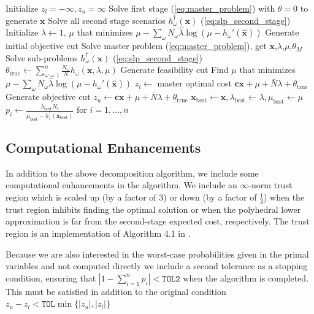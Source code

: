 \documentclass[11pt]{article}
\newcommand{\x}{\mathbf{x}}
\newcommand{\xh}{\hat{\x}}
\newcommand{\lh}{\hat{\lambda}}
\renewcommand{\c}{\mathbf{c}}
\begin{document}
\begin{algorithmic}
	\State Initialize $z_l = -\infty, z_u = \infty$
	\State Solve first stage (\ref{eq:master_problem}) with $\theta = 0$  to generate $\x$
	\State Solve all second stage scenarios $h^\dagger_\omega(\x)$ (\ref{eq:slp_second_stage})
	\State Initialize $\lambda \gets 1$, $\mu$ that minimizes $\mu - \sum_\omega N_\omega \lh \log(\mu - h_\omega'(\xh))$
	\State Generate initial objective cut
		\State Solve master problem (\ref{eq:master_problem}), get $\x$,$\lambda$,$\mu$,$\theta_M$
		\State Solve sub-problems $h^\dagger_\omega(\x)$ (\ref{eq:slp_second_stage})
		\State $\theta_{\text{true}} \gets \sum_{\omega=1}^n \frac{N_\omega}{N} h_\omega(\x,\lambda,\mu)$
		\If{$\mu < \max_i h_i'(\x)$}
			\State Generate feasibility cut
			\State Find $\mu$ that minimizes $\mu - \sum_\omega N_\omega \lh \log(\mu - h_\omega'(\xh))$
		\Else
			\State $z_l \gets$ master optimal cost $\c\x + \mu + \bar{N}\lambda + \theta_{\text{true}}$
		\EndIf
		\State Generate objective cut
		\If{$\c\x + \mu + \bar{N}\lambda + \theta_{\text{true}} < z_u$}
			\State $z_u \gets \c\x + \mu + \bar{N}\lambda + \theta_{\text{true}}$
			\State $\x_\text{best} \gets \x, \lambda_\text{best} \gets \lambda, \mu_\text{best} \gets \mu$
			\State $p_i \gets \frac{\lambda_\text{best} N_i}{\mu_\text{best} - h^\dagger_i(\x_\text{best})}$ for $i = 1, \dots, n$
		\EndIf
	\EndWhile
\end{algorithmic}

\subsection{Computational Enhancements}

In addition to the above decomposition algorithm, we include some computational enhancements in the algorithm.  We include an $\infty$-norm trust region which is scaled up (by a factor of $3$) or down (by a factor of $\tfrac{1}{4}$) when the trust region inhibits finding the optimal solution or when the polyhedral lower approximation is far from the second-stage expected cost, respectively.  The trust region is an implementation of Algorithm 4.1 in \cite{nocedal1999numerical}.

Because we are also interested in the worst-case probabilities given in the primal variables and not computed directly we include a second tolerance as a stopping condition, ensuring that $\left| 1 - \sum_{i=1}^n p_i \right| < \texttt{TOL2}$ when the algorithm is completed.  This must be satisfied in addition to the original condition $z_u - z_l < \texttt{TOL}\min\{|z_u|,|z_l|\}$
\end{document}
